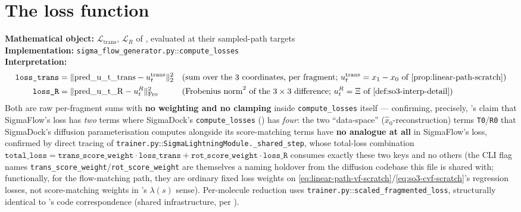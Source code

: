 \documentclass[11pt,a4paper]{report}
\theoremstyle{definition}
\theoremstyle{remark}
\newcommand{\file}[1]{\texttt{#1}}
\newcommand{\pyfunc}[1]{\texttt{#1}}
\begin{document}
\section{The loss function}
\label{sec:sigmaflow-loss}

\begin{codebox}
\textbf{Mathematical object:} $\mathcal L_{\mathrm{trans}}$,
$\mathcal L_R$ of ,
evaluated at their sampled-path targets \\
\textbf{Implementation:} \file{sigma\_flow\_generator.py}::\pyfunc{compute\_losses} \\
\textbf{Interpretation:}
\begin{align*}
\texttt{loss\_trans} &= \|\mathrm{pred\_u\_t\_trans} - u_t^{\mathrm{trans}}\|_2^2
&&\text{(sum over the 3 coordinates, per fragment; }u_t^{\mathrm{trans}}=x_1-x_0\text{ of \Cref{prop:linear-path-scratch})}\\
\texttt{loss\_R} &= \|\mathrm{pred\_u\_t\_R} - u_t^R\|_{\mathrm{Fro}}^2
&&\text{(Frobenius norm}^2\text{ of the }3\times3\text{ difference; }u_t^R=\Xi\text{ of \Cref{def:so3-interp-detail})}
\end{align*}
Both are raw per-fragment sums with \textbf{no weighting and no clamping}
inside \pyfunc{compute\_losses} itself --- confirming, precisely,
's claim that SigmaFlow's loss has
\emph{two} terms where SigmaDock's \pyfunc{compute\_losses}
() has \emph{four}: the two ``data-space''
($\hat x_0$-reconstruction) terms \texttt{T0}/\texttt{R0} that SigmaDock's
diffusion parameterisation computes alongside its score-matching terms have
\textbf{no analogue at all} in SigmaFlow's loss, confirmed by direct
tracing of \file{trainer.py}::\pyfunc{SigmaLightningModule.\_shared\_step},
whose total-loss combination
$\texttt{total\_loss} = \texttt{trans\_score\_weight}\cdot\texttt{loss\_trans} + \texttt{rot\_score\_weight}\cdot\texttt{loss\_R}$
consumes exactly these two keys and no others (the CLI flag names
\texttt{trans\_score\_weight}/\texttt{rot\_score\_weight} are themselves a
naming holdover from the diffusion codebase this file is shared with;
functionally, for the flow-matching path, they are ordinary fixed loss
weights on \eqref{eq:linear-path-vf-scratch}/\eqref{eq:so3-cvf-scratch}'s
regression losses, not score-matching weights in
's $\lambda(s)$ sense). Per-molecule reduction
uses \file{trainer.py}::\pyfunc{scaled\_fragmented\_loss}, structurally
identical to 's code correspondence (shared
infrastructure, per ).
\end{codebox}
\end{document}
